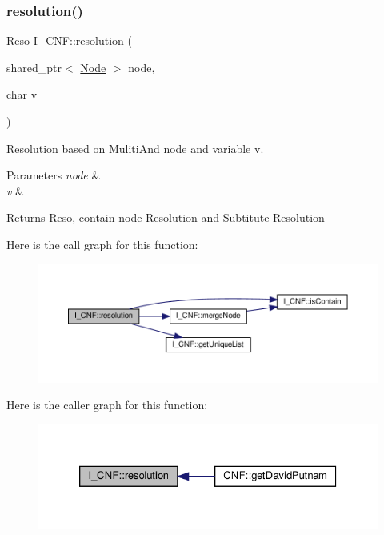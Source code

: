 \subsubsection{\texorpdfstring{resolution()}{resolution()}}
{\footnotesize\ttfamily \hyperlink{struct_reso}{Reso} I\+\_\+\+C\+N\+F\+::resolution (\begin{DoxyParamCaption}\item[{shared\+\_\+ptr$<$ \hyperlink{class_node}{Node} $>$}]{node,  }\item[{char}]{v }\end{DoxyParamCaption})}



Resolution based on Muliti\+And node and variable v. 


\begin{DoxyParams}{Parameters}
{\em node} & \\
\hline
{\em v} & \\
\hline
\end{DoxyParams}
\begin{DoxyReturn}{Returns}
\hyperlink{struct_reso}{Reso}, contain node Resolution and Subtitute Resolution 
\end{DoxyReturn}
Here is the call graph for this function\+:\nopagebreak
\begin{figure}[H]
\begin{center}
\leavevmode
\includegraphics[width=350pt]{d5/d80/struct_i___c_n_f_a1b3282ebd2d998f5fe3aa3e192346ac1_cgraph}
\end{center}
\end{figure}
Here is the caller graph for this function\+:\nopagebreak
\begin{figure}[H]
\begin{center}
\leavevmode
\includegraphics[width=326pt]{d5/d80/struct_i___c_n_f_a1b3282ebd2d998f5fe3aa3e192346ac1_icgraph}
\end{center}
\end{figure}
\mbox{\label{struct_i___c_n_f_aa7adb25b5dbb1f4dcddaf56dab338add}} 
